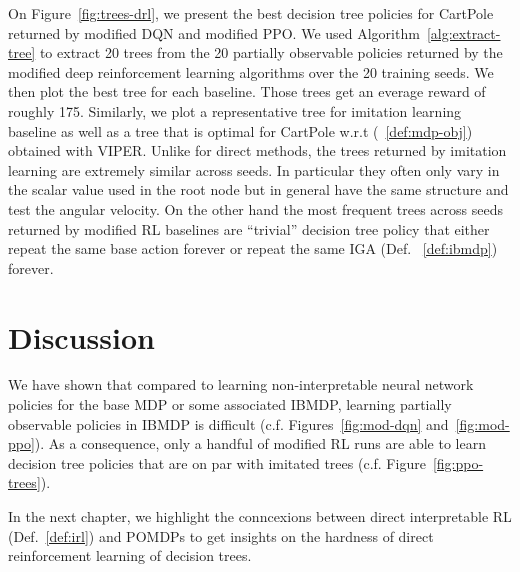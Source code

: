 On Figure~\ref{fig:trees-drl}, we present the best decision tree policies for CartPole returned by modified DQN and modified PPO.
We used Algorithm~\ref{alg:extract-tree} to extract 20 trees from the 20 partially observable policies returned by the modified deep reinforcement learning algorithms over the 20 training seeds.
We then plot the best tree for each baseline.
Those trees get an everage reward of roughly 175.
Similarly, we plot a representative tree for imitation learning baseline as well as a tree that is optimal for CartPole w.r.t (~\ref{def:mdp-obj}) obtained with VIPER. 
Unlike for direct methods, the trees returned by imitation learning are extremely similar across seeds. In particular they often only vary in the scalar value used in the root node but in general have the same structure and test the angular velocity.
On the other hand the most frequent trees across seeds returned by modified RL baselines are ``trivial'' decision tree policy that either repeat the same base action forever or repeat the same IGA (Def. ~\ref{def:ibmdp}) forever.


\section{Discussion}
We have shown that compared to learning non-interpretable neural network policies for the base MDP or some associated IBMDP, learning partially observable policies in IBMDP is difficult (c.f. Figures~\ref{fig:mod-dqn} and~\ref{fig:mod-ppo}). 
As a consequence, only a handful of modified RL runs are able to learn decision tree policies that are on par with imitated trees (c.f. Figure~\ref{fig:ppo-trees}).

In the next chapter, we highlight the conncexions between direct interpretable RL (Def.~\ref{def:irl}) and POMDPs to get insights on the hardness of direct reinforcement learning of decision trees.